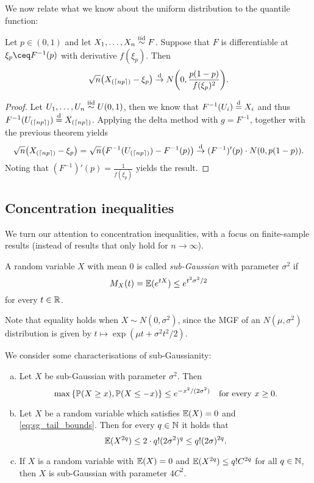 We now relate what we know about the uniform distribution to the  quantile function: 
\begin{theorem}
    Let $p \in (0, 1)$ and let $X_1, \dotsc, X_n \overset{\mathrm{iid}}{\sim} F$. Suppose that $F$ is differentiable at $\xi_p \ceq F^{-1}(p)$ with derivative $f(\xi_p)$. Then
    \[
    \sqrt n \qty(X_{(\lceil np\rceil)} - \xi_p) \overset{\mathrm{d}}{\to} N\qty(0, \frac{p(1-p)}{f(\xi_p)^2}).
    \]
\end{theorem}

\begin{proof}
    Let $U_1, \dotsc, U_n \overset{\mathrm{iid}}{\sim} U(0, 1)$, then we know that $F^{-1}(U_i) \overset{\mathrm{d}}= X_i$ and thus $F^{-1} (U_{(\lceil np\rceil)}) \overset{\mathrm{d}}= X_{(\lceil np\rceil)}$. Applying the delta method with $g = F^{-1}$, together with the previous theorem yields
    \[
    \sqrt n \qty(X_{(\lceil np\rceil)} - \xi_p) = \sqrt n \qty(F^{-1}(U_{(\lceil np\rceil)}) - F^{-1}(p)) \overset{\mathrm{d}}{\to} (F^{-1})'(p) \cdot  N(0, p(1-p)).
    \]
    Noting that $(F^{-1})'(p) = \frac1{f(\xi_p)}$ yields the result. 
\end{proof}

\subsection{Concentration inequalities}
We turn our attention to concentration inequalities, with a focus on finite-sample results (instead of results that only hold for $n \to\infty$). 
\begin{definition}
    A random variable $X$ with mean 0 is called \emph{sub-Gaussian} with parameter $\sigma^2$ if
    \[
    M_X(t) = \mathbb E(e^{tX}) \leq e^{t^2\sigma^2/2}
    \]
    for every $t \in \mathbb R$. 
\end{definition}
Note that equality holds when $X \sim N(0, \sigma^2)$, since the MGF of an $N(\mu, \sigma^2)$ distribution is given by $t \mapsto \exp(\mu t + \sigma^2 t^2 /2)$. 


\begin{proposition}We consider some characterisations of sub-Gaussianity: 
    \begin{enumerate}[(a)]
        \item     Let $X$ be sub-Gaussian with parameter $\sigma^2$. Then 
        \begin{equation} \label{eq:sg_tail_bounds}
        \max\qty{\mathbb P(X \geq x), \mathbb P(X \leq -x)} \leq e^{-x^2/(2\sigma^2)} \quad\text{for every $x \geq 0$}.
        \end{equation}
        
        \item Let $X$ be a random variable which satisfies $\mathbb E(X) = 0$ and \cref{eq:sg_tail_bounds}. Then for every $q \in \mathbb N$ it holds that
        \[
        \mathbb E(X^{2q}) \leq 2 \cdot q! (2\sigma^2)^q \leq q! (2\sigma)^{2q}.
        \]
        
        \item If $X$ is a random variable with $\mathbb E(X) = 0$ and $\mathbb E(X^{2q}) \leq q! C^{2q}$ for all $q \in \mathbb N$, then $X$ is sub-Gaussian with parameter $4C^2$. 
    \end{enumerate}

\end{proposition}

